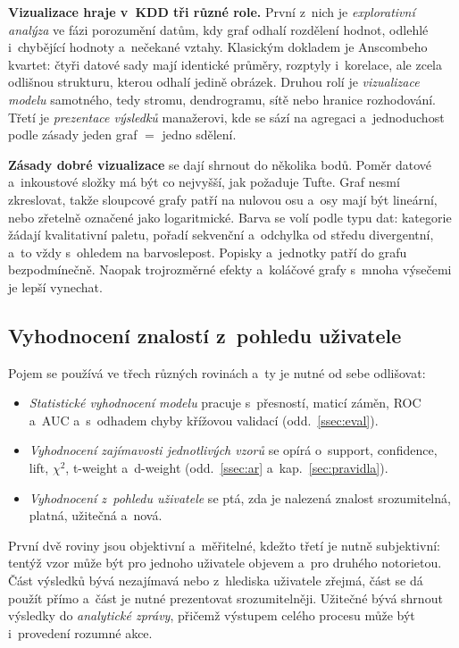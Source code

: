 \documentclass[11pt,a4paper]{article}
\theoremstyle{definition}
\begin{document}
\textbf{Vizualizace hraje v~KDD tři různé role.} První z~nich je \emph{explorativní analýza}
ve fázi porozumění datům, kdy graf odhalí rozdělení hodnot, odlehlé i~chybějící hodnoty
a~nečekané vztahy. Klasickým dokladem je Anscombeho kvartet: čtyři datové sady mají identické
průměry, rozptyly i~korelace, ale zcela odlišnou strukturu, kterou odhalí jedině obrázek. Druhou
rolí je \emph{vizualizace modelu} samotného, tedy stromu, dendrogramu, sítě nebo hranice
rozhodování. Třetí je \emph{prezentace výsledků} manažerovi, kde se sází na agregaci
a~jednoduchost podle zásady jeden graf $=$ jedno sdělení.

\textbf{Zásady dobré vizualizace} se dají shrnout do několika bodů. Poměr datové a~inkoustové
složky má být co nejvyšší, jak požaduje Tufte. Graf nesmí zkreslovat, takže sloupcové grafy
patří na nulovou osu a~osy mají být lineární, nebo zřetelně označené jako logaritmické. Barva
se volí podle typu dat: kategorie žádají kvalitativní paletu, pořadí sekvenční a~odchylka od
středu divergentní, a~to vždy s~ohledem na barvoslepost. Popisky a~jednotky patří do grafu
bezpodmínečně. Naopak trojrozměrné efekty a~koláčové grafy s~mnoha výsečemi je lepší vynechat.

\subsection{Vyhodnocení znalostí z~pohledu uživatele}

Pojem  se používá ve třech různých rovinách a~ty je nutné
od sebe odlišovat:
\begin{itemize}
\item \emph{Statistické vyhodnocení modelu} pracuje s~přesností, maticí záměn, ROC a~AUC
      a~s~odhadem chyby křížovou validací (odd.~\ref{ssec:eval}).
\item \emph{Vyhodnocení zajímavosti jednotlivých vzorů} se opírá o~support, confidence, lift,
      $\chi^2$, t-weight a~d-weight (odd.~\ref{ssec:ar} a~kap.~\ref{sec:pravidla}).
\item \emph{Vyhodnocení z~pohledu uživatele} se ptá, zda je nalezená znalost srozumitelná,
      platná, užitečná a~nová.
\end{itemize}
První dvě roviny jsou objektivní a~měřitelné, kdežto třetí je nutně subjektivní: tentýž vzor
může být pro jednoho uživatele objevem a~pro druhého notorietou. Část výsledků bývá nezajímavá
nebo z~hlediska uživatele zřejmá, část se dá použít přímo a~část je nutné prezentovat
srozumitelněji. Užitečné bývá shrnout výsledky do \emph{analytické zprávy}, přičemž výstupem
celého procesu může být i~provedení rozumné akce.
\end{document}
